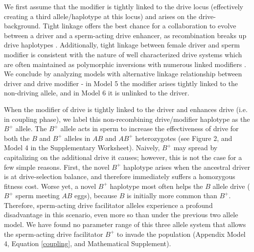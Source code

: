 \documentclass{pnastwo}
\begin{document}
\begin{article}
We first assume that the modifier is tightly
        linked to the drive locus (effectively creating a third
        allele/haplotype at this locus) and arises on the drive-background. 
Tight linkage offers the best
        chance for a collaboration to evolve between a driver and
       a sperm-acting drive  enhancer, as recombination breaks up drive haplotypes \cite{Thomson1974,Charlesworth1978,Haig1991}. 
Additionally, tight linkage between female driver and sperm modifier is consistent with the nature of well characterized drive systems which are often maintained as polymorphic inversions with numerous linked modifiers \cite{Burt2006}. 
We conclude by analyzing models with alternative linkage relationship between driver and drive modifier - 
	in Model 5 the modifier arises tightly linked to the non-driving allele, 
	and in Model 6 it is unlinked to the driver. 


When the modifier of drive is tightly linked to the driver and
enhances drive (i.e. in coupling phase), 
	we label  this non-recombining drive/modifier haplotype as the $B^+$ allele.  
The $B^+$ allele acts in sperm to increase the effectiveness of drive for both
	the $B$ and  $B^{+}$ alleles in $AB$ and $AB^{+}$ heterozygotes (see Figure 2, and Model 4 in the Supplementary Worksheet). 
Naively, $B^{+}$ may spread by capitalizing on the additional drive it causes; however,  
	this is not the case for a few simple reasons. 
First, the novel $B^{+}$ haplotype
	arises when the ancestral driver 
	is at drive-selection balance, 
	and therefore immediately suffers a homozygous fitness cost.  
Worse yet, a novel $B^{+}$ haplotype most often helps 
	the $B$  allele drive ($B^+$ sperm meeting $AB$ eggs), because $B$ is initially more common than $B^{+}$. 
Therefore, sperm-acting drive facilitator alleles experience a profound disadvantage 
	in this scenario, even more so than under the previous two allele model. 
We have found no parameter range of this
	three allele system that allows the sperm-acting drive facilitator $B^{+}$ to
	invade the population (Appendix Model 4, Equation \eqref{coupling}, and Mathematical Supplement). 


\end{article}
\end{document}
